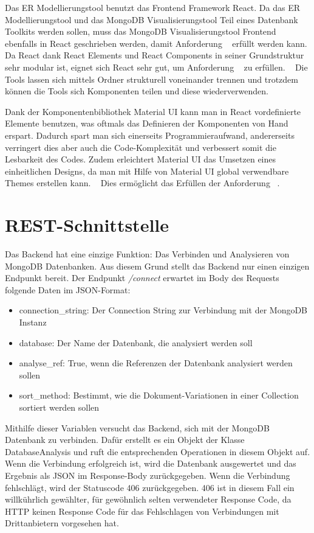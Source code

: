 Das ER Modellierungstool benutzt das Frontend Framework React.
Da das ER Modellierungstool und das MongoDB Visualisierungstool Teil eines Datenbank Toolkits werden sollen, muss das MongoDB Visualisierungstool Frontend ebenfalls in React geschrieben werden, damit Anforderung ~ erfüllt werden kann.
Da React dank React Elements und React Components in seiner Grundstruktur  sehr modular ist, eignet sich React sehr gut, um Anforderung ~ zu erfüllen.
~\autocite{banks:react}
Die Tools lassen sich mittels Ordner strukturell voneinander trennen und trotzdem können die Tools sich Komponenten teilen und diese wiederverwenden.

Dank der Komponentenbibliothek Material UI kann man in React vordefinierte Elemente benutzen, was oftmals das Definieren der Komponenten von Hand erspart.
Dadurch spart man sich einerseits Programmieraufwand, andererseits verringert dies aber auch die Code-Komplexität und verbessert somit die Lesbarkeit des Codes.
Zudem erleichtert Material UI das Umsetzen eines einheitlichen Designs, da man mit Hilfe von Material UI global verwendbare Themes erstellen kann.
~\autocite{mui:mui}
Dies ermöglicht das Erfüllen der Anforderung ~.

\section{REST-Schnittstelle}
\label{sec:rest_schnittstelle}
Das Backend hat eine einzige Funktion:
Das Verbinden und Analysieren von MongoDB Datenbanken.
Aus diesem Grund stellt das Backend nur einen einzigen Endpunkt bereit.
Der Endpunkt \textit{/connect} erwartet im Body des Requests folgende Daten im JSON-Format:
\begin{itemize}
    \item connection\_string: Der Connection String zur Verbindung mit der MongoDB Instanz
    \item database: Der Name der Datenbank, die analysiert werden soll
    \item analyse\_ref: True, wenn die Referenzen der Datenbank analysiert werden sollen
    \item sort\_method: Bestimmt, wie die Dokument-Variationen in einer Collection sortiert werden sollen
\end{itemize}
Mithilfe dieser Variablen versucht das Backend, sich mit der MongoDB Datenbank zu verbinden.
Dafür erstellt es ein Objekt der Klasse DatabaseAnalysis und ruft die entsprechenden Operationen in diesem Objekt auf.
Wenn die Verbindung erfolgreich ist, wird die Datenbank ausgewertet und das Ergebnis als JSON im Response-Body zurückgegeben.
Wenn die Verbindung fehlschlägt, wird der Statuscode 406 zurückgegeben.
406 ist in diesem Fall ein willkührlich gewählter, für gewöhnlich selten verwendeter Response Code, da HTTP keinen Response Code für das Fehlschlagen von Verbindungen mit Drittanbietern vorgesehen hat.

